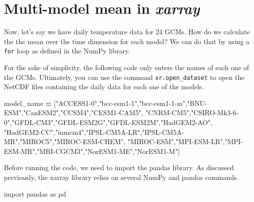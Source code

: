 \documentclass[
]{book}
\newenvironment{Shaded}{\begin{snugshade}}{\end{snugshade}}
\newcommand{\ImportTok}[1]{#1}
\newcommand{\NormalTok}[1]{#1}
\newcommand{\OperatorTok}[1]{\textcolor[rgb]{0.81,0.36,0.00}{\textbf{#1}}}
\newcommand{\StringTok}[1]{\textcolor[rgb]{0.31,0.60,0.02}{#1}}
\begin{document}
\hypertarget{multi-model-mean-in-xarray}{%
\section{\texorpdfstring{Multi-model mean in \emph{xarray}}{Multi-model mean in xarray}}\label{multi-model-mean-in-xarray}}

Now, let's say we have daily temperature data for 24 GCMs. How do we calculate the the mean over the time dimension for each model? We can do that by using a \texttt{for} loop as defined in the NumPy library.

For the sake of simplicity, the following code only enters the names of each one of the GCMs. Ultimately, you can use the command \texttt{xr.open\_dataset} to open the NetCDF files containing the daily data for each one of the models.

\begin{Shaded}
\begin{Highlighting}[]
\NormalTok{model\_name }\OperatorTok{=}\NormalTok{ [}\StringTok{"ACCESS1{-}0"}\NormalTok{,}\StringTok{"bcc{-}csm1{-}1"}\NormalTok{,}\StringTok{"bcc{-}csm1{-}1{-}m"}\NormalTok{,}\StringTok{"BNU{-}ESM"}\NormalTok{,}\StringTok{"CanESM2"}\NormalTok{,}\StringTok{"CCSM4"}\NormalTok{,}\StringTok{"CESM1{-}CAM5"}\NormalTok{,}
              \StringTok{"CNRM{-}CM5"}\NormalTok{,}\StringTok{"CSIRO{-}Mk3{-}6{-}0"}\NormalTok{,}\StringTok{"GFDL{-}CM3"}\NormalTok{,}\StringTok{"GFDL{-}ESM2G"}\NormalTok{,}\StringTok{"GFDL{-}ESM2M"}\NormalTok{,}\StringTok{"HadGEM2{-}AO"}\NormalTok{,}
              \StringTok{"HadGEM2{-}CC"}\NormalTok{,}\StringTok{"inmcm4"}\NormalTok{,}\StringTok{"IPSL{-}CM5A{-}LR"}\NormalTok{,}\StringTok{"IPSL{-}CM5A{-}MR"}\NormalTok{,}\StringTok{"MIROC5"}\NormalTok{,}\StringTok{"MIROC{-}ESM{-}CHEM"}\NormalTok{,}
              \StringTok{"MIROC{-}ESM"}\NormalTok{,}\StringTok{"MPI{-}ESM{-}LR"}\NormalTok{,}\StringTok{"MPI{-}ESM{-}MR"}\NormalTok{,}\StringTok{"MRI{-}CGCM3"}\NormalTok{,}\StringTok{"NorESM1{-}ME"}\NormalTok{,}\StringTok{"NorESM1{-}M"}\NormalTok{]}
\end{Highlighting}
\end{Shaded}

Before running the code, we need to import the pandas library. As discussed previously, the xarray library relies on several NumPy and pandas commands.

\begin{Shaded}
\begin{Highlighting}[]
\ImportTok{import}\NormalTok{ pandas }\ImportTok{as}\NormalTok{ pd}
\end{Highlighting}
\end{Shaded}
\end{document}
